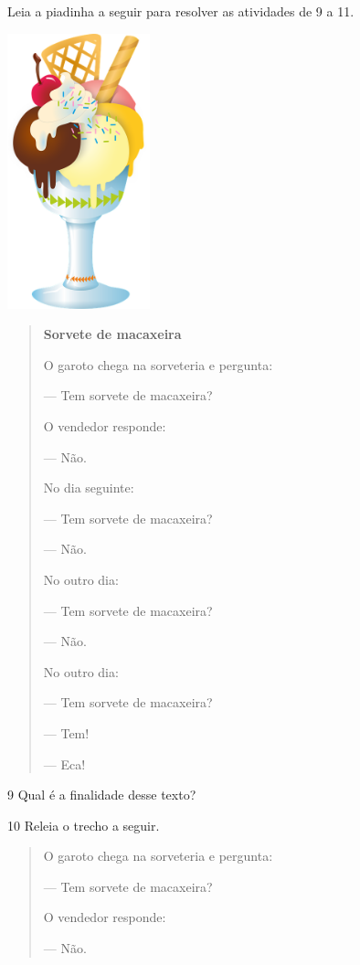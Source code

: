 Leia a piadinha a seguir para resolver as atividades de 9 a 11.


\includegraphics[width=1.61997in,height=3.13542in]{./media/image20.png}

\begin{quote}
\textbf{Sorvete de macaxeira}

O garoto chega na sorveteria e pergunta:

--- Tem sorvete de macaxeira?

O vendedor responde:

--- Não.

No dia seguinte:

--- Tem sorvete de macaxeira?

--- Não.

No outro dia:

--- Tem sorvete de macaxeira?

--- Não.

No outro dia:

--- Tem sorvete de macaxeira?

--- Tem!

--- Eca!

\end{quote}

\num{9} Qual é a finalidade desse texto?



\num{10} Releia o trecho a seguir.

\begin{quote}
O garoto chega na sorveteria e pergunta:

--- Tem sorvete de macaxeira?

O vendedor responde:

--- Não.
\end{quote}

